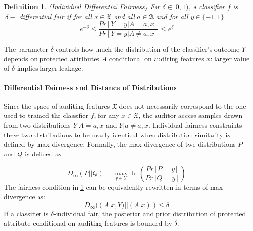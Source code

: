 \documentclass{article}
\newtheorem{defn}{Definition}[section]
\begin{document}
\begin{defn}(Individual Differential Fairness)
\label{def: idf}
For $\delta \in [0, 1)$, a classifier $f$ is $\ \delta-$ differential fair if for all $x\in\mathfrak{X}$ and all $a\in \mathfrak{A}$ and for all $y\in\{-1, 1\}$
\begin{equation}
\label{eq: idf}
   e^{-\delta} \leq \frac{Pr[Y=y|A =a, x]}{Pr[Y=y|A\neq a, x]} \leq e^{\delta}
\end{equation}
\end{defn}

The parameter $\delta$ controls how much the distribution of the classifier's outcome $Y$ depends on protected attributes $A$ conditional on auditing features $x$: larger value of $\delta$ implies larger leakage. 

\paragraph{Differential Fairness and Distance of Distributions}
Since the space of auditing features $\mathfrak{X}$ does not necessarily correspond to the one used to trained the classifier $f$, for any $x\in \mathfrak{X}$, the auditor access samples drawn from two distributions $Y|A=a, x$ and $Y|a\neq a, x$. Individual fairness constraints these two distributions to be nearly identical when distribution similarity is defined by max-divergence. Formally, the max divergence of two distributions $P$ and $Q$ is defined as 

\begin{equation}
D_{\infty}(P||Q) = \max_{y\in Y}\ln\left(\frac{Pr[P=y]}{Pr[Q=y]}\right)
\end{equation}
The fairness condition in \ref{def: idf} can be equivalently rewritten in terms of max divergence as:
\begin{equation}
\label{eq: maxdiv_idf}
D_{\infty}((A|x, Y)||(A| x)) \leq \delta
\end{equation}
If a classifier is $\delta$-individual fair, the posterior and prior distribution of protected attribute conditional on auditing features is bounded by $\delta$. 
\end{document}

